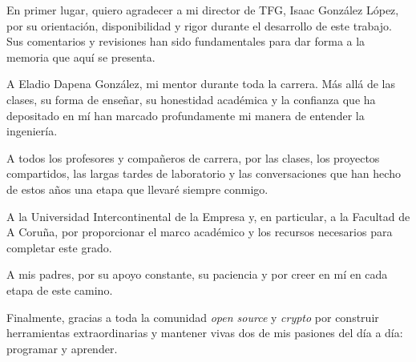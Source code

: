 En primer lugar, quiero agradecer a mi director de TFG, Isaac González López, por su orientación, disponibilidad y rigor durante el desarrollo de este trabajo. Sus comentarios y revisiones han sido fundamentales para dar forma a la memoria que aquí se presenta.

A Eladio Dapena González, mi mentor durante toda la carrera. Más allá de las clases, su forma de enseñar, su honestidad académica y la confianza que ha depositado en mí han marcado profundamente mi manera de entender la ingeniería.

A todos los profesores y compañeros de carrera, por las clases, los proyectos compartidos, las largas tardes de laboratorio y las conversaciones que han hecho de estos años una etapa que llevaré siempre conmigo.

A la Universidad Intercontinental de la Empresa y, en particular, a la Facultad de A Coruña, por proporcionar el marco académico y los recursos necesarios para completar este grado.

A mis padres, por su apoyo constante, su paciencia y por creer en mí en cada etapa de este camino.

Finalmente, gracias a toda la comunidad \emph{open source} y \emph{crypto} por construir herramientas extraordinarias y mantener vivas dos de mis pasiones del día a día: programar y aprender.

